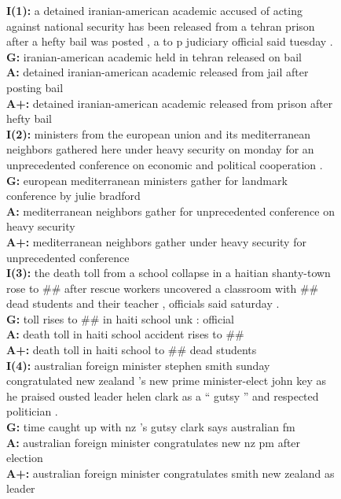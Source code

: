 \documentclass[11pt,a4paper]{article}
\begin{document}
\begin{figure}
  \scriptsize
  \begin{framed}    

\textbf{I(1):} a detained iranian-american academic accused of acting against national security has been released from a tehran prison after a hefty bail was posted , a to
p judiciary official said tuesday . \\
\textbf{G:} iranian-american academic held in tehran released on bail \\
\textbf{A:} detained iranian-american academic released from jail after posting bail \\
\textbf{A+:} detained iranian-american academic released from prison after hefty bail \\


\textbf{I(2):} ministers from the european union and its mediterranean neighbors gathered here under heavy security on monday for an unprecedented conference on economic and political cooperation . \\
\textbf{G:} european mediterranean ministers gather for landmark conference by julie bradford \\
\textbf{A:} mediterranean neighbors gather for unprecedented conference on heavy security \\
\textbf{A+:} mediterranean neighbors gather under heavy security for unprecedented conference \\

\textbf{I(3):} the death toll from a school collapse in a haitian shanty-town rose to \#\# after rescue workers uncovered a classroom with \#\# dead students and their teacher , officials said saturday . \\
\textbf{G:} toll rises to \#\# in haiti school unk : official \\
\textbf{A:} death toll in haiti school accident rises to \#\# \\
\textbf{A+:} death toll in haiti school to \#\# dead students \\

\textbf{I(4):} australian foreign minister stephen smith sunday congratulated new zealand 's new prime minister-elect john key as he praised ousted leader helen clark as a `` gutsy '' and respected politician . \\
\textbf{G:} time caught up with nz 's gutsy clark says australian fm \\
\textbf{A:} australian foreign minister congratulates new nz pm after election \\
\textbf{A+:} australian foreign minister congratulates smith new zealand as leader \\


\end{framed}
\end{figure}
\end{document}

